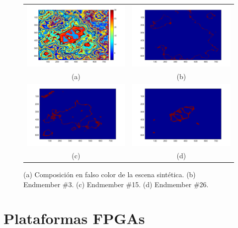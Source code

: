 \begin{figure}[ht]
\centering
\begin{tabular}{cc}
\includegraphics[height=0.30\textwidth]{./images/Synthetic1.pdf} &
\includegraphics[height=0.30\textwidth]{./images/Synthetic1_end_3.pdf}\\
(a) & (b)\\
\includegraphics[height=0.30\textwidth]{./images/Synthetic1_end_15.pdf} &
\includegraphics[height=0.30\textwidth]{./images/Synthetic1_end_26.pdf}\\
(c) & (d)\\
\end{tabular}
\caption{(a) Composición en falso color de la escena sintética. (b) Endmember \#3. (c) Endmember \#15. (d) Endmember \#26.}
\label{figure:synthetic}
\end{figure}

\section{Plataformas FPGAs}

